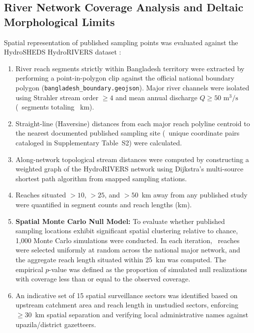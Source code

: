 \documentclass[authoryear,preprint,12pt]{elsarticle}
\begin{document}
\subsection{River Network Coverage Analysis and Deltaic Morphological Limits}
Spatial representation of published sampling points was evaluated against the HydroSHEDS HydroRIVERS dataset \citep{Lehner2013}:
\begin{enumerate}
    \item River reach segments strictly within Bangladesh territory were extracted by performing a point-in-polygon clip against the official national boundary polygon (\texttt{bangladesh\_\allowbreak boundary.geojson}). Major river channels were isolated using Strahler stream order $\ge 4$ and mean annual discharge $Q \ge 50\text{ m}^3/\text{s}$ (\TotalMajorReachesCount\ segments totaling \TotalMajorLengthKm~km).
    \item Straight-line (Haversine) distances from each major reach polyline centroid to the nearest documented published sampling site (\UniqueStationCoordinates\ unique coordinate pairs cataloged in Supplementary Table~S2) were calculated.
    \item Along-network topological stream distances were computed by constructing a weighted graph of the HydroRIVERS network using Dijkstra's multi-source shortest path algorithm from snapped sampling stations.
    \item Reaches situated $>10$, $>25$, and $>50$~km away from any published study were quantified in segment counts and reach lengths (km).
    \item \textbf{Spatial Monte Carlo Null Model:} To evaluate whether published sampling locations exhibit significant spatial clustering relative to chance, 1,000 Monte Carlo simulations were conducted. In each iteration, \UniqueStationCoordinates\ reaches were selected uniformly at random across the national major network, and the aggregate reach length situated within 25~km was computed. The empirical $p$-value was defined as the proportion of simulated null realizations with coverage less than or equal to the observed coverage.
    \item An indicative set of 15 spatial surveillance sectors was identified based on upstream catchment area and reach length in unstudied sectors, enforcing $\ge 30$~km spatial separation and verifying local administrative names against upazila/district gazetteers.
\end{enumerate}
\end{document}
